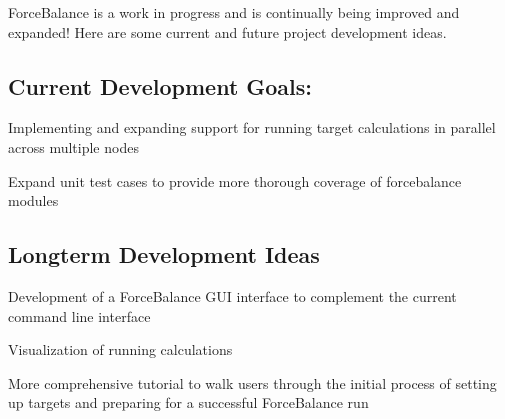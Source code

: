 Force\-Balance is a work in progress and is continually being improved and expanded! Here are some current and future project development ideas.\hypertarget{roadmap_current}{}\subsection{Current Development Goals\-:}\label{roadmap_current}
\begin{DoxyItemize}
\item Implementing and expanding support for running target calculations in parallel across multiple nodes \item Expand unit test cases to provide more thorough coverage of forcebalance modules\end{DoxyItemize}
\hypertarget{roadmap_longterm}{}\subsection{Longterm Development Ideas}\label{roadmap_longterm}
\begin{DoxyItemize}
\item Development of a Force\-Balance G\-U\-I interface to complement the current command line interface \item Visualization of running calculations \item More comprehensive tutorial to walk users through the initial process of setting up targets and preparing for a successful Force\-Balance run \end{DoxyItemize}
